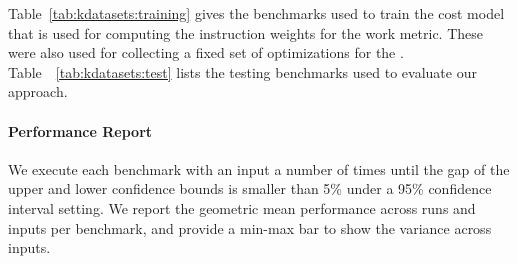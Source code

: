 
Table~\ref{tab:kdatasets:training} gives the benchmarks used to train the cost model that is used for computing the instruction weights for
the work metric. These were also used for collecting a fixed set of optimizations for the {\itercomp}. Table~~\ref{tab:kdatasets:test}
lists the testing benchmarks used to evaluate our approach.


\paragraph{Performance Report}
We execute each benchmark with an input a number of times until the gap of the upper and lower confidence bounds is smaller than 5\% under
a 95\% confidence interval setting. We report the geometric mean performance across runs and inputs per benchmark, and provide a min-max
bar to show the variance across inputs.

